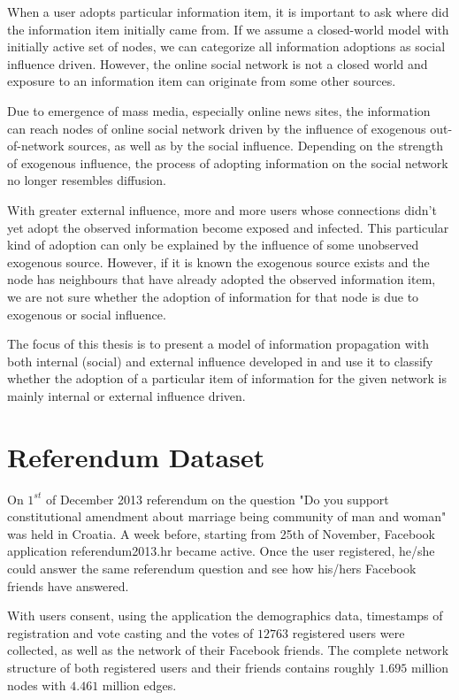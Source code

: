 \documentclass[times, utf8, zavrsni]{fer}
\begin{document}
When a user adopts particular information item, it is important to ask where did the information item  initially came from. If we assume a closed-world model with initially active set of nodes, we can categorize all information adoptions  as social influence driven. However, the online social network is not a closed world and exposure to an information item can originate from some other sources. 

Due to emergence of mass media, especially online news sites, the information can reach nodes of online social network driven by the influence of exogenous out-of-network sources, as well as by the social influence. Depending on the strength of exogenous influence, the process of adopting information on the social network no longer resembles diffusion. 

With greater external influence, more and more users whose connections didn't yet adopt the observed information become exposed  and infected. This particular kind of adoption can only be explained by the influence of some unobserved exogenous source. However, if it is known the exogenous source exists and the node has neighbours that have already adopted the observed information item, we are not sure whether the adoption of information for that node is due to exogenous or social influence.

The focus of this thesis is to present a model of information propagation with both internal (social) and external influence developed in \cite{authority} and use it to classify whether the adoption of a particular item of information for the given network is mainly internal or external influence driven.

\chapter{Referendum Dataset}

  On $1^{st}$ of December 2013 referendum on the question "Do you support constitutional amendment about marriage  being community of man and woman" was held in Croatia. A week before, starting from 25th of November, Facebook application referendum2013.hr \cite{ref} became active. Once the user registered, he/she could answer the same referendum question and see how his/hers Facebook friends have answered.
  
  With users consent, using the application the demographics data, timestamps of registration and vote casting and the votes of $12763$  registered users were collected, as well as the network of their Facebook friends. The complete network structure of both registered users and their friends contains roughly $1.695$ million nodes with $4.461$ million edges.  
  
\end{document}
